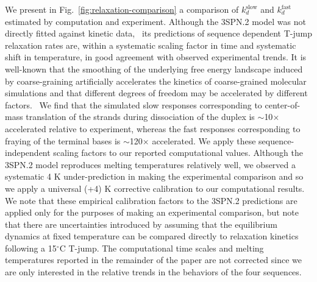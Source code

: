 \documentclass[journal=jpcbfk,manuscript=article]{achemso}
\begin{document}
We present in Fig.~\ref{fig:relaxation-comparison} a comparison of $k_d^\mathrm{slow}$ and $k_d^\mathrm{fast}$ estimated by computation and experiment. Although the 3SPN.2 model was not directly fitted against kinetic data,~\cite{Hinckley2013AnHybridization} its predictions of sequence dependent T-jump relaxation rates are, within a systematic scaling factor in time and systematic shift in temperature, in good agreement with observed experimental trends. It is well-known that the smoothing of the underlying free energy landscape induced by coarse-graining artificially accelerates the kinetics of coarse-grained molecular simulations and that different degrees of freedom may be accelerated by different factors.~\citep{Marrink2007TheSimulations, Fritz2011MultiscaleDynamics, Marrink2013PerspectiveModel} We find that the simulated slow responses corresponding to center-of-mass translation of the strands during dissociation of the duplex is $\sim$10$\times$ accelerated relative to experiment, whereas the fast responses corresponding to fraying of the terminal bases is $\sim$120$\times$ accelerated. We apply these sequence-independent scaling factors to our reported computational values. Although the 3SPN.2 model reproduces melting temperatures relatively well, we observed a systematic 4 K under-prediction in making the experimental comparison and so we apply a universal (+4) K corrective calibration to our computational results. We note that these empirical calibration factors to the 3SPN.2 predictions are applied only for the purposes of making an experimental comparison, but note that there are uncertainties introduced by assuming that the equilibrium dynamics at fixed temperature can be compared directly to relaxation kinetics following a 15$^\circ$C T-jump. The computational time scales and melting temperatures reported in the remainder of the paper are not corrected since we are only interested in the relative trends in the behaviors of the four sequences.
\end{document}
